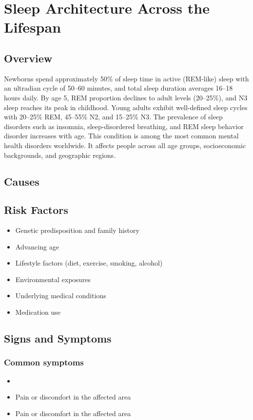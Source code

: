 \chapter{Sleep Architecture Across the Lifespan}
\label{sec:Sleep Architecture Across the Lifespan}

\section{Overview}
Newborns spend approximately 50\% of sleep time in active (REM-like) sleep with an ultradian cycle of 50--60 minutes, and total sleep duration averages 16--18 hours daily. By age 5, REM proportion declines to adult levels (20--25\%), and N3 sleep reaches its peak in childhood. Young adults exhibit well-defined sleep cycles with 20--25\% REM, 45--55\% N2, and 15--25\% N3. The prevalence of sleep disorders such as insomnia, sleep-disordered breathing, and REM sleep behavior disorder increases with age. This condition is among the most common mental health disorders worldwide. It affects people across all age groups, socioeconomic backgrounds, and geographic regions.
\section{Causes}
\section{Risk Factors}

\begin{itemize}[noitemsep]
  \item Genetic predisposition and family history
  \item Advancing age
  \item Lifestyle factors (diet, exercise, smoking, alcohol)
  \item Environmental exposures
  \item Underlying medical conditions
  \item Medication use
\end{itemize}
\section{Signs and Symptoms}

\subsection{Common symptoms}
\begin{itemize}[noitemsep]
  \item \item Pain or discomfort in the affected area    \item Pain or discomfort in the affected area
  \end{itemize}

